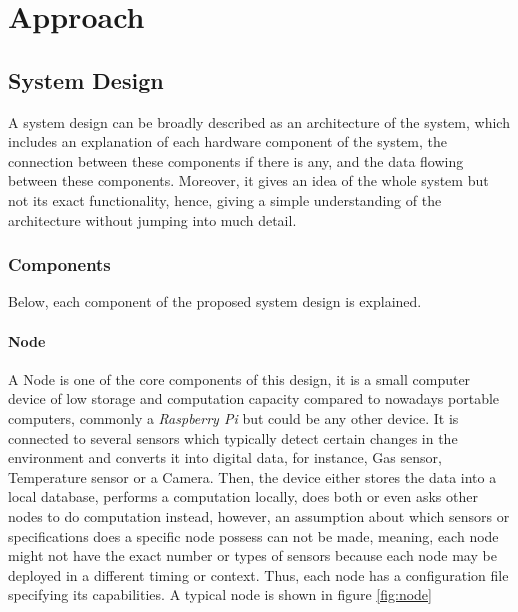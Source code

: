 
\chapter{Approach}\label{chapter:Approach}


\section{System Design }
A system design can be broadly described as an architecture of the system, which includes an explanation of each hardware component of the system, the connection between these components if there is any, and the data flowing between these components. Moreover, it gives an idea of the whole system but not its exact functionality, hence, giving a simple understanding of the architecture without jumping into much detail.\\


\subsection{Components}
\label{sub:components}
Below, each component of the proposed system design is explained.

\subsubsection{Node}
\label{subsub:node}
A Node is one of the core components of this design, it is a small computer device of low storage and computation capacity compared to nowadays portable computers, commonly a \textit{Raspberry Pi} but could be any other device. It is connected to several sensors which typically detect certain changes in the environment and converts it into digital data, for instance, Gas sensor, Temperature sensor or a Camera. Then, the device either stores the data into a local database, performs a computation locally, does both or even asks other nodes to do computation instead, however, an assumption about which sensors or specifications does a specific node  possess can not be made, meaning, each node might not have the exact number or types of sensors because each node may be deployed in a different timing or context. Thus, each node has a configuration file specifying its capabilities. A typical node is shown in figure \ref{fig:node}

